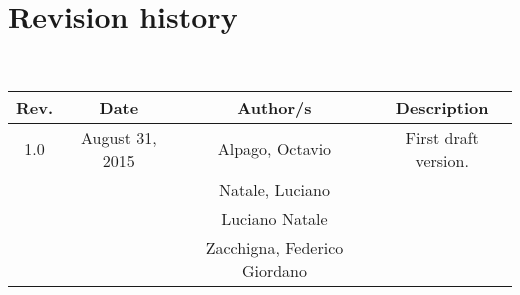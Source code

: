 \newpage
\section*{Revision history}
\label{sec:rev}

\

\begin{center}
\begin{tabular}{|c|c|c|c|}
\hline
\textbf{Rev.} & \textbf{Date} & \textbf{Author/s} & \textbf{Description}\\
\hline
\hline
1.0 & August 31, 2015 & Alpago, Octavio      & First draft version. \\
    &                 & Natale, Luciano      &  \\
    &                 & Luciano Natale       & \\
    &                 & Zacchigna, Federico Giordano & \\
\hline
\end{tabular}
\end{center}
